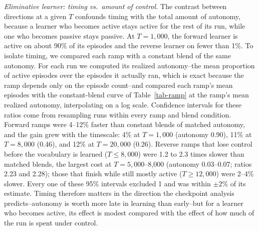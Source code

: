 \documentclass[11pt]{article}
\begin{document}
\textit{Eliminative learner: timing vs.\ amount of control.} The contrast between directions at a given $T$ confounds timing with the total amount of autonomy, because a learner who becomes active stays active for the rest of its run, while one who becomes passive stays passive. At $T=1{,}000$, the forward learner is active on about 90\% of its episodes and the reverse learner on fewer than 1\%. To isolate timing, we compared each ramp with a constant blend of the same autonomy. For each run we computed its realized autonomy--the mean proportion of active episodes over the episodes it actually ran, which is exact because the ramp depends only on the episode count--and compared each ramp's mean episodes with the constant-blend curve of Table~\ref{tab-ramp} at the ramp's mean realized autonomy, interpolating on a log scale. Confidence intervals for these ratios come from resampling runs within every ramp and blend condition. Forward ramps were 4--12\% faster than constant blends of matched autonomy, and the gain grew with the timescale: 4\% at $T=1{,}000$ (autonomy 0.90), 11\% at $T=8{,}000$ (0.46), and 12\% at $T=20{,}000$ (0.26). Reverse ramps that lose control before the vocabulary is learned ($T \le 8{,}000$) were 1.2 to 2.3 times slower than matched blends, the largest cost at $T=5{,}000$--8,000 (autonomy 0.03--0.07; ratios 2.23 and 2.28); those that finish while still mostly active ($T \ge 12{,}000$) were 2--4\% slower. Every one of these 95\% intervals excluded 1 and was within $\pm 2$\% of its estimate. Timing therefore matters in the direction the checkpoint analysis predicts--autonomy is worth more late in learning than early--but for a learner who becomes active, its effect is modest compared with the effect of how much of the run is spent under control.
\end{document}
